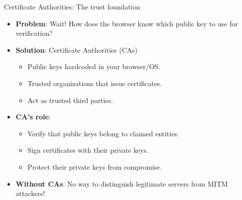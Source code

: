 \documentclass[aspectratio=169, lualatex,  10pt,dvipsnames,svgnames]{beamer} %
\def\enrouge#1{\textcolor{rouge}{#1}}
\begin{document}
\begin{frame}{Certificate Authorities: The trust foundation}
	\begin{itemize}
		\item \textbf{Problem}: \enrouge{Wait!} How does the browser know which public key to use for verification? \pause
		\item \textbf{Solution}: Certificate Authorities (CAs)
		      \begin{itemize}
			      \item Public keys hardcoded in your browser/OS.
			      \item Trusted organizations that issue certificates.
			      \item Act as trusted third parties. \pause
		      \end{itemize}
		\item \textbf{CA's role}:
		      \begin{itemize}
			      \item Verify that public keys belong to claimed entities.
			      \item Sign certificates with their private keys.
			      \item Protect their private keys from compromise.\pause
		      \end{itemize}
		\item \textbf{Without CAs}: No way to distinguish legitimate servers from MITM attackers!
	\end{itemize}
\end{frame}
\end{document}
